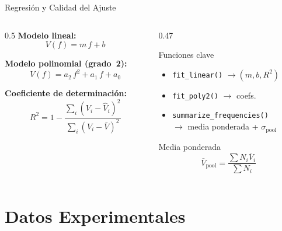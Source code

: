 \documentclass[aspectratio=169,12pt]{beamer}
\begin{document}
\begin{frame}{Regresión y Calidad del Ajuste}
	\begin{columns}
		\begin{column}{0.5\textwidth}
			\textbf{Modelo lineal:}
			\begin{equation*}
				V(f) = m\,f + b
			\end{equation*}

			\textbf{Modelo polinomial (grado~2):}
			\begin{equation*}
				V(f) = a_2\,f^2 + a_1\,f + a_0
			\end{equation*}

			\vspace{0.3em}
			\textbf{Coeficiente de determinación:}
			\begin{equation*}
				R^2 = 1 - \frac{\sum_i (V_i - \hat{V}_i)^2}
				{\sum_i (V_i - \bar{V})^2}
			\end{equation*}

		\end{column}
		\begin{column}{0.47\textwidth}
			\begin{alertblock}{Funciones clave}
				\begin{itemize}\small
					\item \texttt{fit\_linear()} $\to (m,b,R^2)$
					\item \texttt{fit\_poly2()} $\to$ coefs.
					\item \texttt{summarize\_frequencies()}\\
					      $\to$ media ponderada + $\sigma_\mathrm{pool}$
				\end{itemize}
			\end{alertblock}
			\vspace{0.3em}
			\begin{exampleblock}{Media ponderada}
				\begin{equation*}
					\bar{V}_\mathrm{pool} = \frac{\sum N_i \bar{V}_i}{\sum N_i}
				\end{equation*}
			\end{exampleblock}
		\end{column}
	\end{columns}
\end{frame}

\section{Datos Experimentales}
\end{document}
